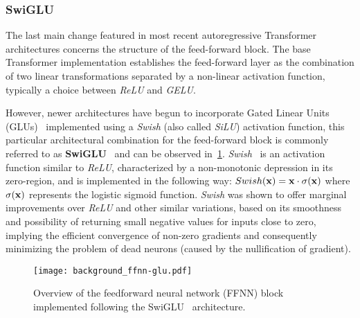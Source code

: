 \subsubsection*{SwiGLU}

The last main change featured in most recent autoregressive Transformer architectures concerns the structure of the feed-forward block.
The base Transformer implementation establishes the feed-forward layer as the combination of two linear transformations separated by a non-linear activation function, typically a choice between \emph{ReLU} and \emph{GELU}.

However, newer architectures have begun to incorporate Gated Linear Units (GLUs)~\cite{dauphin2017} implemented using a \emph{Swish} (also called \emph{SiLU}) activation function, this particular architectural combination for the feed-forward block is commonly referred to as \textbf{SwiGLU}~\cite{shazeer2020} and can be observed in~\cref{fig:background_ffnn-glu}.
\emph{Swish}~\cite{shazeer2020} is an activation function similar to \emph{ReLU}, characterized by a non-monotonic depression in its zero-region, and is implemented in the following way: $Swish(\bm{\mathbf{x}}) = \bm{\mathbf{x}} \cdot \sigma(\bm{\mathbf{x}})$ where $\sigma(\bm{\mathbf{x}})$ represents the logistic sigmoid function.
\emph{Swish} was shown to offer marginal improvements over \emph{ReLU} and other similar variations, based on its smoothness and possibility of returning small negative values for inputs close to zero, implying the efficient convergence of non-zero gradients and consequently minimizing the problem of dead neurons (caused by the nullification of gradient).

\begin{figure}[t!]
    \centering
    \texttt{[image: background\_ffnn-glu.pdf]}
    \caption{Overview of the feedforward neural network (FFNN) block implemented following the SwiGLU~\cite{shazeer2020} architecture.}
    \label{fig:background_ffnn-glu}
\end{figure}

